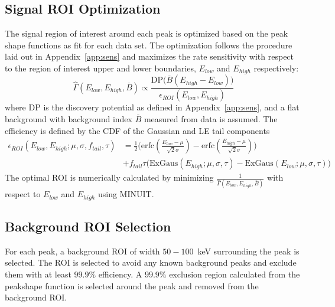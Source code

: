 \documentclass[notitlepage,rmp,aps,10pt]{revtex4-1}
\begin{document}
\subsection{Signal ROI Optimization} \label{sec:roiopt}
The signal region of interest around each peak is optimized based on the peak shape functions as fit for each data set.
The optimization follows the procedure laid out in Appendix~\ref{app:sens} and maximizes the rate sensitivity with respect to the region of interest upper and lower boundaries, $E_{low}$ and $E_{high}$ respectively:
\begin{equation}
  \hat\Gamma(E_{low}, E_{high}, \overline B) \propto \frac{\mathrm{DP}\big(\overline B(E_{high}-E_{low})\big)}{\epsilon_{ROI}(E_{low}, E_{high})}
\end{equation}
where $\mathrm{DP}$ is the discovery potential as defined in Appendix~\ref{app:sens}, and a flat background with background index $\overline B$ measured from data is assumed.
The efficiency is defined by the CDF of the Gaussian and LE tail components
\begin{equation}
  \label{eq:PSCDF}
  \begin{aligned}
    \epsilon_{ROI}(E_{low}, E_{high}; \mu, \sigma, f_{tail}, \tau) &= \frac{1}{2}\big(\mathrm{erfc}\left(\frac{E_{low}-\mu}{\sqrt{2}\sigma}\right) - \mathrm{erfc}\left(\frac{E_{high}-\mu}{\sqrt{2}\sigma}\right)\big) \\& + f_{tail}\tau\big(\mathrm{ExGaus}(E_{high}; \mu, \sigma, \tau)-\mathrm{ExGaus}(E_{low}; \mu, \sigma, \tau)\big)
  \end{aligned}
\end{equation}
The optimal ROI is numerically calculated by minimizing $\frac{1}{\hat\Gamma(E_{low}, E_{high}, \overline B)}$ with respect to $E_{low}$ and $E_{high}$ using MINUIT\cite{minuit}.

\subsection{Background ROI Selection}
For each peak, a background ROI of width $50-100$~keV surrounding the peak is selected.
The ROI is selected to avoid any known background peaks and exclude them with at least $99.9\%$ efficiency.
A $99.9\%$ exclusion region calculated from the peakshape function is selected around the peak and removed from the background ROI.
\end{document}

